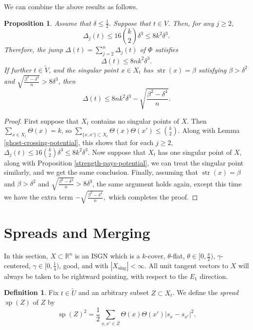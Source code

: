 \documentclass[11pt,reqno,twoside]{amsart}
\newcommand{\sing}{\mathrm{sing}}
\DeclareMathOperator{\spread}{\mathrm{sp}}
\DeclareMathOperator{\strength}{\mathrm{str}}
\newtheorem{proposition}[lemma]{Proposition}
\theoremstyle{definition}
\newtheorem{definition}[lemma]{Definition}
\begin{document}
    We can combine the above results as follows.

    \begin{proposition} \label{potential-jump-final}
        Assume that $\delta \leq \frac{1}{2}$. Suppose that $t \in V$. Then, for any $j \geq 2$, 
        \[\Delta_j(t) \leq 16{k \choose 2}\delta^3 \leq 8k^2\delta^3.\]
        Therefore, the jump $\Delta(t) = \sum_{j=2}^n \Delta_j(t)$ of $\Phi$ satisfies
        \[\Delta(t) \leq 8nk^2\delta^3.\] If further $t \in \tilde V$, and the singular point $x \in X_t$ has $\strength(x) = \beta$ satisfying $\beta > \delta^2$ and $\sqrt{\frac{\beta^2-\delta^4}{n}} > 8\delta^3$, then 
        \[\Delta(t) \leq 8nk^2\delta^3 - \sqrt{\frac{\beta^2-\delta^4}{n}}.\]
    \end{proposition}
        \begin{proof}
            First suppose that $X_t$ contains no singular points of $X$. Then $\sum_{x \in X_t}\Theta(x) = k$, so $\sum_{\{x,x'\} \subset X_t} \Theta(x)\Theta(x') \leq {k \choose 2}. $ Along with Lemma \ref{ghost-crossing-potential}, this shows that for each $j \geq 2$, $\Delta_j(t) \leq 16 {k \choose 2} \delta^3 \leq 8k^2\delta^3$. Now suppose that $X_t$ has one singular point of $X$, along with Proposition \ref{strength-pays-potential}, we can treat the singular point similarly, and we get the same conclusion. Finally, assuming that $\strength(x) = \beta$ and $\beta > \delta^2$ and $\sqrt{\frac{\beta^2-\delta^4}{n}} > 8\delta^3$, the same argument holds again, except this time we have the extra term $-\sqrt{\frac{\beta^2-\delta^4}{n}},$ which completes the proof.
        \end{proof}

        

        
    

    

\section{Spreads and Merging}
\label{sec:spreadsmerging}
    

In this section, $X \subset \mathbb{R}^n$ is an ISGN which is a $k$-cover, $\theta$-flat, $\theta \in [0,\frac{\pi}{2})$, $\gamma$-centered, $\gamma \in [0,\frac{1}{4})$, good, and with $|X_\sing| < \infty.$ All unit tangent vectors to $X$ will always be taken to be rightward pointing, with respect to the $E_1$ direction.

\begin{definition}
    Fix $t \in \tilde U$ and an arbitrary subset $Z \subset X_t$. We define the \emph{spread} $\spread(Z)$ of $Z$ by 
    \[\spread(Z)^2 = \frac{1}{2} \sum_{x,x' \in Z} \Theta(x)\Theta(x') |s_x-s_{x'}|^2. \]
\end{definition}
\end{document}
